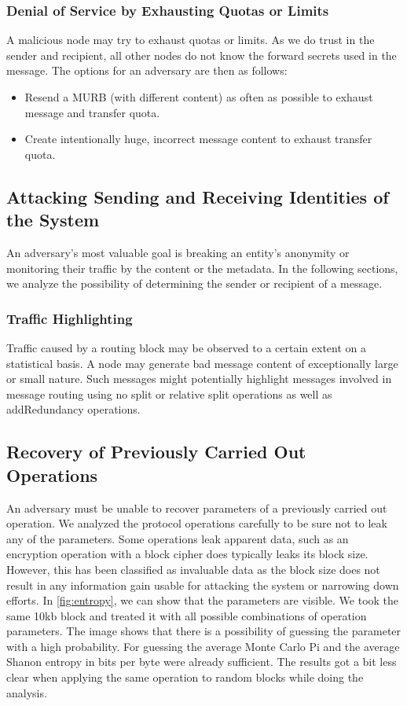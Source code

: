 \subsubsection{Denial of Service by Exhausting Quotas or Limits}
A malicious node may try to exhaust quotas or limits. As we do trust in the sender and recipient, all other nodes do not know the forward secrets used in the message. The options for an adversary are then as follows:

\begin{itemize}
	\item Resend a MURB (with different content) as often as possible to exhaust message and transfer quota. 
	\item Create intentionally huge, incorrect message content to exhaust transfer quota.
\end{itemize}

\subsection{Attacking Sending and Receiving Identities of the \MessageVortex{} System}
An adversary's most valuable goal is breaking an entity's anonymity or monitoring their traffic by the content or the metadata. In the following sections, we analyze the possibility of determining the sender or recipient of a message.


\subsubsection{Traffic Highlighting}
Traffic caused by a routing block may be observed to a certain extent on a statistical basis. A node may generate bad message content of exceptionally large or small nature. Such messages might potentially highlight messages involved in message routing using no split or relative split operations as well as addRedundancy operations.

\subsection{Recovery of Previously Carried Out Operations}
An adversary must be unable to recover parameters of a previously carried out operation. We analyzed the protocol operations carefully to be sure not to leak any of the parameters. Some operations leak apparent data, such as an encryption operation with a block cipher does typically leaks its block size. However, this has been classified as invaluable data as the block size does not result in any information gain usable for attacking the system or narrowing down efforts. In \cref{fig:entropy}, we can show that the parameters are visible. We took the same 10kb block and treated it with all possible combinations of operation parameters. The image shows that there is a possibility of guessing the parameter with a high probability. For guessing the average Monte Carlo Pi and the average Shanon entropy in bits per byte were already sufficient. The results got a bit less clear when applying the same operation to random blocks while doing the analysis. 

